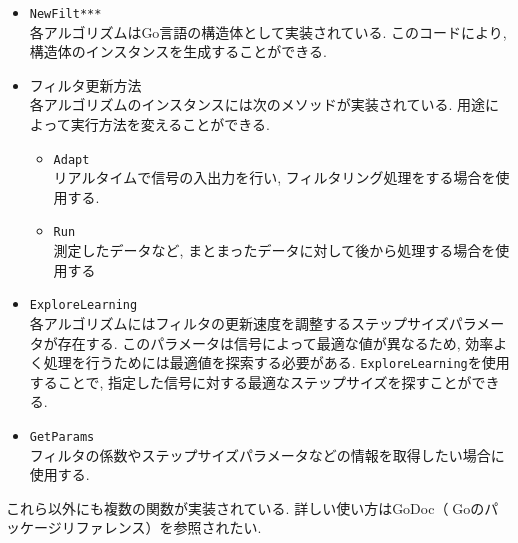 \begin{itemize}
\tightlist
\item
  \texttt{NewFilt***} \\ 
  各アルゴリズムはGo言語の構造体として実装されている. このコードにより, 構造体のインスタンスを生成することができる. 
\item
  フィルタ更新方法 \\
  各アルゴリズムのインスタンスには次のメソッドが実装されている. 用途によって実行方法を変えることができる. 

  \begin{itemize}
  \tightlist
  \item
    \texttt{Adapt} \\
    リアルタイムで信号の入出力を行い, フィルタリング処理をする場合を使用する. 
  \item
    \texttt{Run} \\
    測定したデータなど, まとまったデータに対して後から処理する場合を使用する
  \end{itemize}
\item
  \texttt{ExploreLearning} \\
  各アルゴリズムにはフィルタの更新速度を調整するステップサイズパラメータが存在する. このパラメータは信号によって最適な値が異なるため, 効率よく処理を行うためには最適値を探索する必要がある. \texttt{ExploreLearning}を使用することで, 指定した信号に対する最適なステップサイズを探すことができる. 
\item
  \texttt{GetParams} \\
  フィルタの係数やステップサイズパラメータなどの情報を取得したい場合に使用する. 
\end{itemize}

これら以外にも複数の関数が実装されている. 詳しい使い方はGoDoc（Goのパッケージリファレンス）\cite{godoc:online}を参照されたい. 
